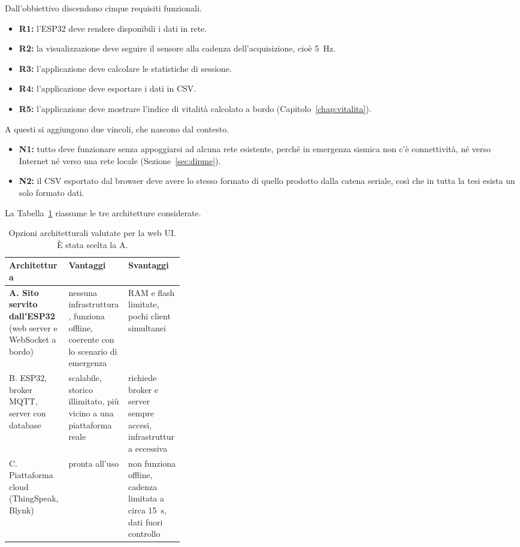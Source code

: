Dall'obbiettivo discendono cinque requisiti funzionali.
\begin{itemize}
  \item \textbf{R1:} l'ESP32 deve rendere disponibili i dati in rete.
  \item \textbf{R2:} la visualizzazione deve seguire il sensore alla cadenza
    dell'acquisizione, cioè 5~Hz.
  \item \textbf{R3:} l'applicazione deve calcolare le statistiche di sessione.
  \item \textbf{R4:} l'applicazione deve esportare i dati in CSV.
  \item \textbf{R5:} l'applicazione deve mostrare l'indice di vitalità calcolato a bordo
    (Capitolo~\ref{chap:vitalita}).
\end{itemize}
A questi si aggiungono due vincoli, che nascono dal contesto.
\begin{itemize}
  \item \textbf{N1:} tutto deve funzionare senza appoggiarsi ad alcuna rete esistente,
    perché in emergenza sismica non c'è connettività, né verso Internet né verso una rete
    locale (Sezione~\ref{sec:dipme}).
  \item \textbf{N2:} il CSV esportato dal browser deve avere lo stesso formato di quello
    prodotto dalla catena seriale, così che in tutta la tesi esista un solo formato dati.
\end{itemize}
La Tabella~\ref{tab:webui-opzioni} riassume le tre architetture considerate.

\begin{table}[!htbp]
\centering
\caption{Opzioni architetturali valutate per la web UI. È stata scelta la A.}
\label{tab:webui-opzioni}
\small
\begin{tabularx}{\linewidth}{@{}p{0.34\linewidth}XX@{}}
\toprule
\textbf{Architettura} & \textbf{Vantaggi} & \textbf{Svantaggi} \\
\midrule
\textbf{A. Sito servito dall'ESP32} (web server e WebSocket a bordo) &
  nessuna infrastruttura, funziona offline, coerente con lo scenario di emergenza &
  RAM e flash limitate, pochi client simultanei \\
B. ESP32, broker MQTT, server con database &
  scalabile, storico illimitato, più vicino a una piattaforma reale &
  richiede broker e server sempre accesi, infrastruttura eccessiva \\
C. Piattaforma cloud (ThingSpeak, Blynk) &
  pronta all'uso &
  non funziona offline, cadenza limitata a circa 15~s, dati fuori controllo \\
\bottomrule
\end{tabularx}
\end{table}

